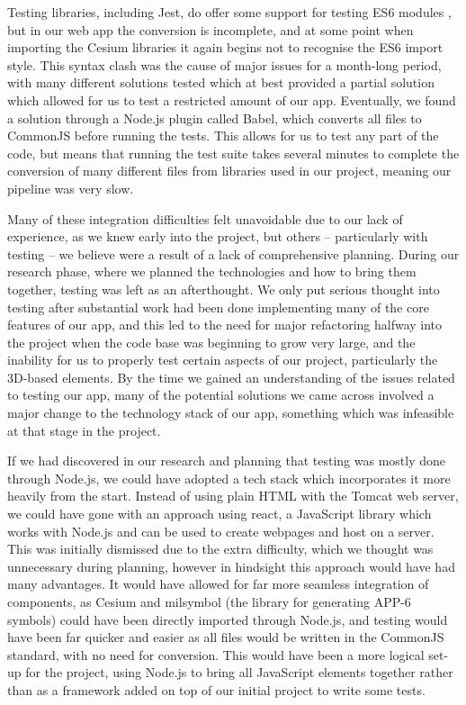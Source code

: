 \documentclass{l3proj}
\begin{document}
Testing libraries, including Jest, do offer some support for testing ES6 modules \cite{JestES6}, but in our web app the conversion is incomplete, and at some point when importing the Cesium libraries it again begins not to recognise the ES6 import style. This syntax clash was the cause of major issues for a month-long period, with many different solutions tested which at best provided a partial solution which allowed for us to test a restricted amount of our app. Eventually, we found a solution through a Node.js plugin called Babel, which converts all files to CommonJS before running the tests\cite{Babel}. This allows for us to test any part of the code, but means that running the test suite takes several minutes to complete the conversion of many different files from libraries used in our project, meaning our pipeline was very slow.

Many of these integration difficulties felt unavoidable due to our lack of experience, as we knew early into the project, but others – particularly with testing – we believe were a result of a lack of comprehensive planning. During our research phase, where we planned the technologies and how to bring them together, testing was left as an afterthought. We only put serious thought into testing after substantial work had been done implementing many of the core features of our app, and this led to the need for major refactoring halfway into the project when the code base was beginning to grow very large, and the inability for us to properly test certain aspects of our project, particularly the 3D-based elements. By the time we gained an understanding of the issues related to testing our app, many of the potential solutions we came across involved a major change to the technology stack of our app, something which was infeasible at that stage in the project. 

If we had discovered in our research and planning that testing was mostly done through Node.js, we could have adopted a tech stack which incorporates it more heavily from the start. Instead of using plain HTML with the Tomcat web server, we could have gone with an approach using react, a JavaScript library which works with Node.js and can be used to create webpages and host on a server\cite{React}. This was initially dismissed due to the extra difficulty, which we thought was unnecessary during planning, however in hindsight this approach would have had many advantages. It would have allowed for far more seamless integration of components, as Cesium and milsymbol (the library for generating APP-6 symbols) could have been directly imported through Node.js, and testing would have been far quicker and easier as all files would be written in the CommonJS standard, with no need for conversion. This would have been a more logical set-up for the project, using Node.js to bring all JavaScript elements together rather than as a framework added on top of our initial project to write some tests.
\end{document}
